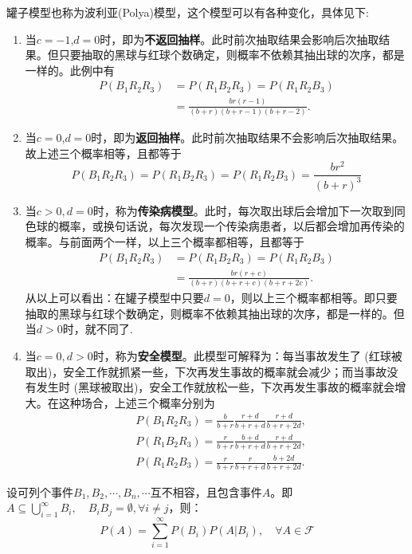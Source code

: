 罐子模型也称为波利亚(Polya)模型，这个模型可以有各种变化，具体见下:
\begin{enumerate}
    \item 当$c=-1$,$d=0$时，即为\textbf{不返回抽样}。此时前次抽取结果会影响后次抽取结果。但只要抽取的黑球与红球个数确定，则概率不依赖其抽出球的次序，都是一样的。此例中有
          \begin{align*}
              P(B_1 R_2 R_3) & = P(R_1 B_2 R_3) = P(R_1 R_2 B_3)        \\
                             & = \frac{br(r-1)}{(b+r) (b+r-1) (b+r-2)}.
          \end{align*}
    \item 当$c=0$,$d=0$时，即为\textbf{返回抽样}。此时前次抽取结果不会影响后次抽取结果。故上述三个概率相等，且都等于
          \[ P(B_1 R_2 R_3) = P(R_1 B_2 R_3) = P(R_1 R_2 B_3) = \frac{br^2}{(b+r)^3} \]
    \item 当$c>0, d=0$时，称为\textbf{传染病模型}。此时，每次取出球后会增加下一次取到同色球的概率，或换句话说，每次发现一个传染病患者，以后都会增加再传染的概率。与前面两个一样，以上三个概率都相等，且都等于
          \begin{align*}
              P(B_1 R_2 R_3) & = P(R_1 B_2 R_3) = P(R_1 R_2 B_3)       \\
                             & = \frac{br(r+c)}{(b+r)(b+r+c)(b+r+2c)}.
          \end{align*}
          从以上可以看出：在罐子模型中只要$d=0$，则以上三个概率都相等。即只要抽取的黑球与红球个数确定，则概率不依赖其抽出球的次序，都是一样的。但当$d>0$时，就不同了.
    \item 当$c=0, d>0$时，称为\textbf{安全模型}。此模型可解释为：每当事故发生了 (红球被取出)，安全工作就抓紧一些，下次再发生事故的概率就会减少；而当事故没有发生时 (黑球被取出)，安全工作就放松一些，下次再发生事故的概率就会增大。在这种场合，上述三个概率分别为
          \begin{align*}
               & P(B_1 R_2 R_3) = \frac{b}{b+r} \frac{r+d}{b+r+d} \frac{r+d}{b+r+2d}, \\
               & P(R_1 B_2 R_3) = \frac{r}{b+r} \frac{b+d}{b+r+d} \frac{r+d}{b+r+2d}, \\
               & P(R_1 R_2 B_3) = \frac{r}{b+r} \frac{r}{b+r+d} \frac{b+2d}{b+r+2d}.
          \end{align*}
\end{enumerate}

\begin{theorem}[全概率公式]
    设可列个事件$B_1, B_2, \cdots, B_n, \cdots $互不相容，且包含事件$A$。即$A \subseteq \bigcup_{i=1}^{\infty} B_i,\quad  B_i B_j= \emptyset, \forall i \neq j$，则：
    \[ P(A) = \sum_{i=1}^{\infty} P(B_i) P(A | B_i) ,\quad \forall A \in \mathscr{F}\]
\end{theorem}

